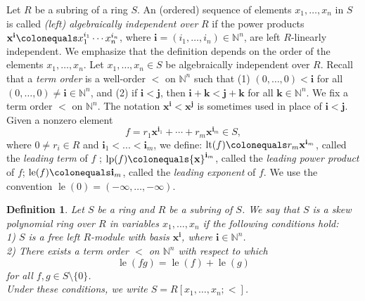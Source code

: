 \documentclass[11pt,a4paper]{article}
\theoremstyle{theorem}
\newtheorem{definition}{Definition}[section]
\numberwithin{equation}{section}
\begin{document}
		Let $R$ be a subring of a ring $S$. An (ordered) sequence of elements $x_1,\dots,x_n$ in \(S\) is called \textit{(left) algebraically independent over} $R$ if the power products ${\mathbf{x}}^{\mathbf{i}}\colonequals x_1^{i_1}\cdots x_n^{i_n}$, where $\mathbf{i}=(i_1,\dots,i_n)\in \mathbb{N}^n$, are left $R$-linearly independent. We emphasize that the definition depends on the order of the elements  $x_1,\dots,x_n$.  Let $x_1,\dots,x_n\in S$ be algebraically independent over $R$.  Recall that a \textit{term order} is  a well-order $<$ on  \(\mathbb{N}^n\)  such that (1) $(0,\dots,0)<\mathbf{i}$ for all $(0,\dots,0)\neq \mathbf{i} \in \mathbb{N}^n$, and (2) if $\mathbf{i}<\mathbf{j}$, then $\mathbf{i}+\mathbf{k} < \mathbf{j}+\mathbf{k}$ for all  $\mathbf{k} \in \mathbb{N}^n$.  We fix a term order $<$ on \(\mathbb{N}^n\).  The notation \(\mathbf{x}^{\mathbf{i}} < \mathbf{x}^{\mathbf{j}}\) is sometimes used in place of \({\mathbf{i}} < {\mathbf{j}}\).
		Given a nonzero element 
		$$f=r_{1}{\mathbf{x}}^{\mathbf{i}_1}+\cdots+r_{m}{\mathbf{x}}^{\mathbf{i}_m}\in S,$$
		where $0\neq r_i\in R$ and $\mathbf{i}_1 <...<\mathbf{i}_m$, we define: $\operatorname{lt}(f)\colonequals r_{m}{\mathbf{x}}^{\mathbf{i}_m}$, called the \textit{leading term} of $f$  ;  $\operatorname{lp}(f)\colonequals{\mathbf{x}}^{\mathbf{i}_m}$, called the \textit{leading power product}  of $f$; $\operatorname{le}(f)\colonequals \mathbf{i}_m$, called the \textit{leading exponent} of $f$. We use the convention \(\operatorname{le}(0) = (-\infty,\dots,-\infty)\). 
		\begin{definition}\label{def: skew-several}
			Let $S$ be a ring and $R$ be a subring of $S$. We say that $S$ is a \emph{skew polynomial ring over $R$ in variables $x_1,\dots,x_n$}    if the following conditions hold:\\
			1) $S$ is a free left $R$-module with basis ${\mathbf{x}}^{\mathbf{i}}$, where $\mathbf{i}\in \mathbb{N}^n$.  \\
			2) There exists a term order $<$ on  $\mathbb{N}^n$ with respect to which
			\[
			\operatorname{le}(fg)=\operatorname{le}(f)+\operatorname{le}(g)
			\]
			for all $f,g\in S\setminus\{0\}$. \\
			Under these conditions, we write $S=R[x_1,\dots,x_n;<]$. 
		\end{definition}
		
\end{document}
